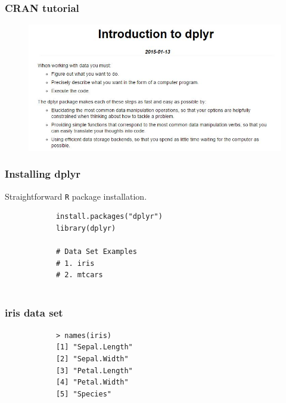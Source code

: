 \documentclass{beamer}
\begin{document}
	\begin{frame}
		\frametitle{CRAN tutorial}
\begin{figure}
\centering
\includegraphics[width=1.15\linewidth]{images/introdplyr}

\end{figure}

		
	\end{frame}
	\begin{frame}[fragile]
		\frametitle{Installing dplyr}
		\large
		Straightforward \texttt{R} package installation.
		\begin{framed}
			\begin{verbatim}
			install.packages("dplyr")
			library(dplyr)
			
			# Data Set Examples
			# 1. iris
			# 2. mtcars
			
			\end{verbatim}
		\end{framed}
	\end{frame}
	
	\begin{frame}[fragile]
		\frametitle{iris data set}
		\Large
		\begin{framed}
			\begin{verbatim}
			> names(iris)
			[1] "Sepal.Length"
			[2] "Sepal.Width" 
			[3] "Petal.Length"
			[4] "Petal.Width" 
			[5] "Species"    
			\end{verbatim}
		\end{framed}
	\end{frame}
	
\end{document}
